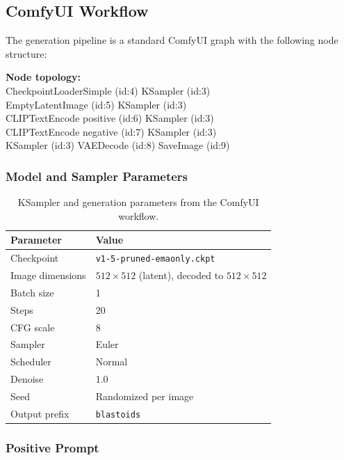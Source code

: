 \documentclass[12pt, a4paper]{article}
\begin{document}
\subsection{ComfyUI Workflow}

The generation pipeline is a standard ComfyUI graph with the following node structure:

\begin{infobox}
\small\ttfamily\color{termgreen}
\textbf{Node topology:}\\
CheckpointLoaderSimple (id:4) \textrightarrow{} KSampler (id:3)\\
EmptyLatentImage (id:5) \textrightarrow{} KSampler (id:3)\\
CLIPTextEncode positive (id:6) \textrightarrow{} KSampler (id:3)\\
CLIPTextEncode negative (id:7) \textrightarrow{} KSampler (id:3)\\
KSampler (id:3) \textrightarrow{} VAEDecode (id:8) \textrightarrow{} SaveImage (id:9)
\end{infobox}

\subsubsection{Model and Sampler Parameters}

\begin{table}[H]
\centering
\begin{tabular}{>{\ttfamily}ll}
\toprule
\textbf{Parameter} & \textbf{Value} \\
\midrule
Checkpoint & \texttt{v1-5-pruned-emaonly.ckpt} \\
Image dimensions & $512 \times 512$ (latent), decoded to $512 \times 512$ \\
Batch size & 1 \\
Steps & 20 \\
CFG scale & 8 \\
Sampler & Euler \\
Scheduler & Normal \\
Denoise & 1.0 \\
Seed & Randomized per image \\
Output prefix & \texttt{blastoids} \\
\bottomrule
\end{tabular}
\caption{KSampler and generation parameters from the ComfyUI workflow.}
\end{table}

\subsubsection{Positive Prompt}
\end{document}
